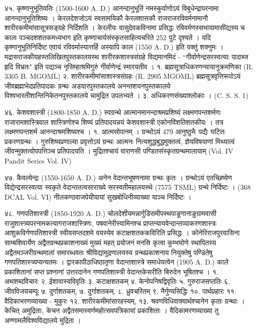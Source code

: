४५. कृष्णानुभूतियतिः (1500-1600 A. D.)
आनन्दानुभूतिं नमस्कुर्वाणोऽयं विबुधेन्द्रापरनामा आनन्दानुभूतिशिष्यः । केरलदेशजोऽयं स्वसामयिकौ केरलशासकौ राजराजरविवर्मनामानौ शारीरकमीमांसासूत्रसङ्ग्रहे निर्दिशति । केरलीयः वासुदेवकविनामा प्रसिद्धः रविवर्मणस्सभायामासीद्यस्य च कालः पञ्चदशशतकमध्यभाग इति कृष्णाचार्यसंस्कृतसाहित्यचरिते 252 पुटे दृश्यते । यदि कृष्णानुभूतिनिर्दिष्ट एवायं रविवर्मास्यात्तर्हि अस्यापि काल (1550 A. D.) इति वक्तुं शक्नुमः । मद्रासराजकीयहस्तलिखितपुस्तकालयस्थ शारीरकशास्त्रसंग्रहे विद्यमानमिदं - ``गीर्वाणेन्द्रसरस्वत्याः पादाब्ज हृदि विभ्रतः" इति पद्यञ्च नृसिम्हाश्रमिगुरुं गीर्वाणेन्द्रं स्मारयतीव ।
१. ब्रह्मसूत्राधिकरणन्यायानुक्रमणिका (R. 3305 B. MGOML)
२. शारीरकमीमांसाशास्त्रसंग्रहः (R. 2905 MGOML)
ब्रह्मसूत्रवृत्तिरूपोऽयं जीवब्रह्माभेदप्रतिपादकः ग्रन्थः अडयारपुस्तकालये अनन्तशयनपुस्तकालये विश्वभारतीशान्तिनिकेतनपुस्तकालये चामुद्रित उपलभ्यते ।
३. अधिकरणसंख्याश्लोकाः । (C. S. S. 1)

४६. केशवशास्त्री (1800-1850 A. D.)
स्वग्रन्थे आत्मानमानन्दाश्रमप्रशिष्यं लक्ष्मणपन्तशर्मणः राजारामशास्त्रिवाल शास्त्रिणोश्च शिष्यं प्रतिपादयन्नयं केशवशास्त्री एकोनविंशतिशतकीयः । तत्र लक्ष्मणपन्तशर्म आनन्दाश्रमशिष्यश्च ।
१. आत्मसोपानम् । ग्रन्थोऽयं 479 आनुष्ठुभैः पद्यैः घटितः प्रकरणग्रन्थः । गुरुशिष्यप्रणाल्या प्रवृत्तोऽयं ग्रन्थः आत्मनः नित्यशुद्धबुद्धमुक्तत्वं, ज्ञेयविषयाणां मिथ्यात्वं जीवन्मुक्तत्वोपपत्तिञ्च प्रतिपादयति । मुद्रितश्चायं वाराणसी पण्डितसंस्कृतग्रन्थमालायाम् (Vol. IV Pandit Series Vol. IV)

४७. कैवल्येन्द्रः (1550-1650 A. D.)
अनेन वेदान्तभूषणनामा ग्रन्थः कृतः । ग्रन्थोऽयं एतच्छिष्येण विद्येन्द्रसरस्वत्या स्वकृते वेदान्ततत्वसाराख्ये सरस्वतीमहालयस्थे (7575 TSML) ग्रन्थे निर्दिष्टः । (368 DCAL Vol. VI) नीलकण्ठवाजपेयीयायां सुखबोधिनीव्याख्या याञ्च निर्दिष्टः ।

४८. गणपतिशास्त्री (1850-1920 A. D.)
चोलदेशीयमन्नार्गुडिसमीपस्थपाङूगानाङुग्रामवासी राजुशास्त्र्यपरनामकत्यागराजशास्त्रिणः, पषवानेरीस्वामिनश्च प्राप्तन्यायवेन्दान्तव्याकरणशास्त्रः आशुकविर्गणपतिशास्त्री स्वीयसप्तदशमे वयस्येव कटाक्षशतककविरिति प्रसिद्धः । कोनेरिराजपुरवासिना साम्बशिवार्येण अद्वैतग्रन्थप्रकाशनाख्यं मुख्यं महत् प्रयोजनं मनसि कृत्वा कुम्भघोणे स्थापितस्य अद्वैतमञ्जरीग्रन्थमालां समारब्धवतः श्रीविद्यामुद्रणालयस्य ग्रन्थप्रकाशनाय नियुक्तेषु पण्डितेषु गणपतिशास्त्र्यप्यन्यतमः । द्वारकापीठाधिष्ठातृणा वेदान्तशास्त्रे समाधेयत्वेन (1905 A. D.) काले प्रकाशितानां सप्त प्रश्नानां उत्तरदानेन गणपतिशास्त्री वेदान्तकेसरीति बिरुदेन भूषितश्च ।
१. अथशब्दविचारः २. ईशावास्यविवृतिः ३. कटाक्षशतकम् ४. केनोपनिषद्विवृतिः ५. गुरुराजसप्ततिः ६. जीवविजयचम्पूः ७. दुर्गाशतकम्, ७. दुर्गाशतकम्. ८. ध्रुवचरितम् ९. नैर्गुण्यसिद्धिः १०. पार्थप्रहारः ११. वैदिकाभरणव्याख्या - मुकुरः १२. शारीरकमीमांसारहस्यम्, १३. श्रवणविधिवाक्यार्थश्चानेन कृताः ग्रन्थाः । केचित् अमुद्रिताः, केचन अद्वैतसमास्वर्णमहोत्सवपत्रिकायां प्रकाशिताः । वैदिकामरणव्याख्या तु अण्णामलैविश्वविद्यालये मुद्रिता ।


